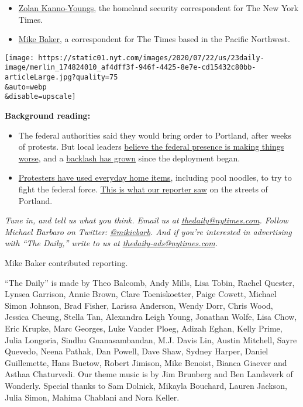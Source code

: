 \begin{itemize}
\item
  \href{https://www.nytimes.com/by/zolan-kanno-youngs}{Zolan
  Kanno-Youngs}, the homeland security correspondent for The New York
  Times.
\item
  \href{https://www.nytimes.com/by/mike-baker?smid=pc-thedaily}{Mike
  Baker}, a correspondent for The Times based in the Pacific Northwest.
\end{itemize}

\texttt{[image: https://static01.nyt.com/images/2020/07/22/us/23daily-image/merlin\_174824010\_af4dff3f-946f-4425-8e7e-cd15432c80bb-articleLarge.jpg?quality=75\\\&auto=webp\\\&disable=upscale]}

\textbf{Background reading:}

\begin{itemize}
\item
  The federal authorities said they would bring order to Portland, after
  weeks of protests. But local leaders
  \href{https://www.nytimes.com/2020/07/17/us/portland-protests.html}{believe
  the federal presence is making things worse}, and a
  \href{https://www.nytimes.com/2020/07/21/us/portland-protests.html}{backlash
  has grown} since the deployment began.
\item
  \href{https://www.nytimes.com/2020/07/22/us/portland-protest-tactics.html}{Protesters
  have used everyday home items}, including pool noodles, to try to
  fight the federal force.
  \href{https://www.nytimes.com/interactive/2020/07/21/us/portland-protests.html}{This
  is what our reporter saw} on the streets of Portland.
\end{itemize}

\emph{Tune in, and tell us what you think. Email us at}
\href{mailto:thedaily@nytimes.com}{\emph{thedaily@nytimes.com}}\emph{.
Follow Michael Barbaro on Twitter:}
\href{https://twitter.com/mikiebarb}{\emph{@mikiebarb}}\emph{. And if
you're interested in advertising with ``The Daily,'' write to us at}
\href{mailto:thedaily-ads@nytimes.com}{\emph{thedaily-ads@nytimes.com}}\emph{.}

Mike Baker contributed reporting.

``The Daily'' is made by Theo Balcomb, Andy Mills, Lisa Tobin, Rachel
Quester, Lynsea Garrison, Annie Brown, Clare Toeniskoetter, Paige
Cowett, Michael Simon Johnson, Brad Fisher, Larissa Anderson, Wendy
Dorr, Chris Wood, Jessica Cheung, Stella Tan, Alexandra Leigh Young,
Jonathan Wolfe, Lisa Chow, Eric Krupke, Marc Georges, Luke Vander Ploeg,
Adizah Eghan, Kelly Prime, Julia Longoria, Sindhu Gnanasambandan, M.J.
Davis Lin, Austin Mitchell, Sayre Quevedo, Neena Pathak, Dan Powell,
Dave Shaw, Sydney Harper, Daniel Guillemette, Hans Buetow, Robert
Jimison, Mike Benoist, Bianca Giaever and Asthaa Chaturvedi. Our theme
music is by Jim Brunberg and Ben Landsverk of Wonderly. Special thanks
to Sam Dolnick, Mikayla Bouchard, Lauren Jackson, Julia Simon, Mahima
Chablani and Nora Keller.

